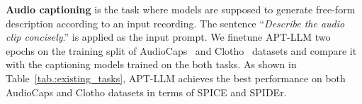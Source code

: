 \documentclass{article} %
\begin{document}
\begin{table}[t]
\centering
\caption{Performance comparison in audio captioning tasks. $\uparrow$ indicates the higher number, the better performance.}
\label{tab.:existing_tasks}
\vspace{1em}
\vspace{-0.3cm}
\end{table}

\textbf{Audio captioning} is the task where models are supposed to generate free-form description according to an input recording. The sentence ``\textit{Describe the audio clip concisely}.'' is applied as the input prompt. We finetune APT-LLM two epochs on the training split of AudioCaps~\citep{kim_audiocaps_2019} and Clotho~\citep{drossos_clotho_2020} datasets and compare it with the captioning models trained on the both tasks. As shown in Table~\ref{tab.:existing_tasks}, APT-LLM achieves the best performance on both AudioCaps and Clotho datasets in terms of SPICE and SPIDEr.
\end{document}
